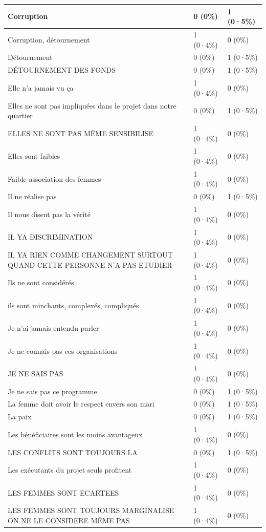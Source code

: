 \documentclass[
]{book}
\begin{document}
\begin{tabular}{l|l|l}
\hline
Corruption & 0 (0\%) & 1 (0·5\%)\\
\hline
Corruption, détournement & 1 (0·4\%) & 0 (0\%)\\
\hline
Détournement & 0 (0\%) & 1 (0·5\%)\\
\hline
DÉTOURNEMENT DES FONDS & 0 (0\%) & 1 (0·5\%)\\
\hline
Elle n'a jamais vu ça & 1 (0·4\%) & 0 (0\%)\\
\hline
Elles ne sont pas impliquées dans le projet dans notre quartier & 0 (0\%) & 1 (0·5\%)\\
\hline
ELLES NE SONT PAS MÊME SENSIBILISE & 1 (0·4\%) & 0 (0\%)\\
\hline
Elles sont faibles & 1 (0·4\%) & 0 (0\%)\\
\hline
Faible association des femmes & 1 (0·4\%) & 0 (0\%)\\
\hline
Il ne réalise pas & 0 (0\%) & 1 (0·5\%)\\
\hline
Il nous disent pas la vérité & 1 (0·4\%) & 0 (0\%)\\
\hline
IL YA DISCRIMINATION & 1 (0·4\%) & 0 (0\%)\\
\hline
IL YA RIEN COMME CHANGEMENT SURTOUT QUAND CETTE PERSONNE N'A PAS ETUDIER & 1 (0·4\%) & 0 (0\%)\\
\hline
Ils ne sont considérés & 1 (0·4\%) & 0 (0\%)\\
\hline
ils sont minchants, complexés, compliqués & 1 (0·4\%) & 0 (0\%)\\
\hline
Je n'ai jamais entendu parler & 1 (0·4\%) & 0 (0\%)\\
\hline
Je ne connais pas ces organisations & 1 (0·4\%) & 0 (0\%)\\
\hline
JE NE SAIS PAS & 1 (0·4\%) & 0 (0\%)\\
\hline
Je ne sais pas ce programme & 0 (0\%) & 1 (0·5\%)\\
\hline
La femme doit avoir le respect envers son mari & 0 (0\%) & 1 (0·5\%)\\
\hline
La paix & 0 (0\%) & 1 (0·5\%)\\
\hline
Les bénéficiaires sont les moins avantageux & 1 (0·4\%) & 0 (0\%)\\
\hline
LES CONFLITS SONT TOUJOURS LA & 0 (0\%) & 1 (0·5\%)\\
\hline
Les exécutants du projet seuls profitent & 1 (0·4\%) & 0 (0\%)\\
\hline
LES FEMMES SONT ECARTEES & 1 (0·4\%) & 0 (0\%)\\
\hline
LES FEMMES SONT TOUJOURS MARGINALISE ON NE LE CONSIDERE MÊME PAS & 1 (0·4\%) & 0 (0\%)\\

\end{tabular}
\end{document}
